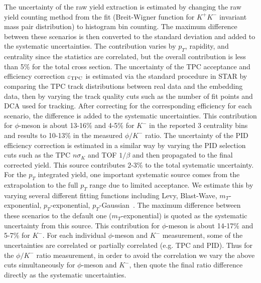 \documentclass[%
 reprint,	
showpacs,
 amsmath,amssymb,
 aps,
 prc,
]{revtex4-1}
\begin{document}
The uncertainty of the raw yield extraction is estimated by changing the raw yield counting method from the fit (Breit-Wigner function for $K^+K^-$ invariant mass pair distribution) to histogram bin counting. The maximum difference between these scenarios is then converted to the standard deviation and added to the systematic uncertainties. The contribution varies by $p_T$, rapidity, and centrality since the statistics are correlated, but the overall contribution is less than 5\% for the total cross section. The uncertainty of the TPC acceptance and efficiency correction $\varepsilon_{\rm TPC}$ is estimated via the standard procedure in STAR by comparing the TPC track distributions between real data and the embedding data, then by varying the track quality cuts such as the number of fit points and DCA used for tracking. After correcting for the corresponding efficiency for each scenario, the difference is added to the systematic uncertainties. This contribution for $\phi$-meson is about 13-16\% and 4-5\% for $K^-$ in the reported 3 centrality bins and results to 10-13\% in the measured $\phi/K^-$ ratio. The uncertainty of the PID efficiency correction is estimated in a similar way by varying the PID selection cuts such as the TPC $n\sigma_{K}$ and TOF $1/\beta$ and then propagated to the final corrected yield. This source contributes 2-3\% to the total systematic uncertainty. For the $p_T$ integrated yield, one important systematic source comes from the extrapolation to the full $p_T$ range due to limited acceptance. We estimate this by varying several different fitting functions including Levy, Blast-Wave, $m_T$-exponential, $p_T$-exponential, $p_T$-Gaussian~\cite{STAR_particleYield}. The maximum difference between these scenarios to the default one ($m_T$-exponential) is quoted as the systematic uncertainty from this source. This contribution for $\phi$-meson is about 14-17\% and 5-7\% for $K^-$. For each individual $\phi$-meson and $K^-$ measurement, some of the uncertainties are correlated or partially correlated (e.g. TPC and PID). Thus for the $\phi/K^-$ ratio measurement, in order to avoid the correlation we vary the above cuts simultaneously for $\phi$-meson and $K^-$, then quote the final ratio difference directly as the systematic uncertainties.
\end{document}
